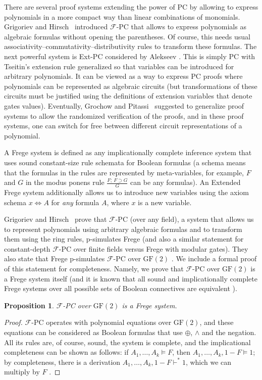 \documentclass[11pt]{article}
\newcommand{\scterm}[1]{{\textrm{\sc #1}}}
\newcommand{\F}{\scterm{Frege}}
\newcommand{\EF}{\scterm{Extended {\F}}}
\newcommand{\extpc}{\scterm{Ext-PC}}
\newcommand{\fpc}{\scterm{$\mathcal{F}$-PC}}
\newcommand{\pc}{\scterm{PC}}
\newcommand{\GF}{\mathrm{GF}}
\numberwithin{equation}{section}
\newtheorem{proposition}[theorem]{Proposition}
\begin{document}
There are several proof systems extending the power of {\pc} by
allowing to express polynomials in a more compact way than linear combinations of monomials.
Grigoriev and Hirsch~\cite{GH03} introduced {\fpc} that allows
to express polynomials as algebraic formulas without opening the parentheses.
Of course, this needs usual associativity--commutativity--distributivity rules
to transform these formulas. The next powerful system is
{\extpc} considered by Alekseev \cite{Ale21}. This is simply {\pc}
with Tseitin's extension rule generalized so that variables
can be introduced for arbitrary polynomials. It can be viewed as
a way to express {\pc} proofs where polynomials can be represented
as algebraic circuits (but transformations of these circuits 
must be justified using the definitions of extension variables 
that denote gates values).
Eventually, Grochow and Pitassi~\cite{Pit96,GP18} suggested to
generalize proof systems to allow the randomized verification of the proofs,
and in these proof systems, one can switch for free between different 
circuit representations of a polynomial.

A {\F} system \cite[\S2]{CR79} is defined as any implicationally complete inference system
that uses sound constant-size rule schemata for Boolean formulas (a schema
means that the formulas in the rules are represented by meta-variables,
for example, $F$ and $G$ in the modus ponens rule $\frac{F;\ F\supset G}{G}$
can be any formulas). An {\EF} system additionally allows us to introduce new
variables using the axiom schema $x \Leftrightarrow A$ for \emph{any} formula $A$, 
where $x$ is a new variable.

Grigoriev and Hirsch~\cite[Theorem 3]{GH03} prove that {\fpc} (over any field),
a system that allows us to represent polynomials using arbitrary algebraic formulas and to transform them using the ring rules,
p-simulates {\F} (and also a similar statement for constant-depth {\fpc} over finite fields versus {\F} with modular gates). They also state that {\F} p-simulates {\fpc} over $\GF(2)$ \cite[Remark 5]{GH03}. We include a formal proof of this statement for completeness.
Namely, we prove that {\fpc} over $\GF(2)$ is a {\F} system itself
(and it is known that all sound and implicationally complete {\F} systems over all possible sets of Boolean connectives are equivalent \cite[Theorem 5.3.1.4.i]{Rec76}).
\begin{proposition}\label{prop:f-sim-fpc}
{\fpc} over $\GF(2)$ is a {\F} system.
\end{proposition}
\begin{proof}
{\fpc} operates with polynomial equations over $\GF(2)$,
and these equations can be considered 
as Boolean formulas that use $\oplus$, $\land$ and the negation.
All its rules are, of course, sound, the system is complete, 
and the implicational completeness
can be shown as follows: if $A_1,\dotsc,A_k\models F$, then
$A_1,\dotsc,A_k,1-F\models 1$; by completeness,
there is a derivation $A_1,\dotsc,A_k,1-F\vdash^* 1$,
which we can multiply by $F$ \cite[Remark 2]{GH03}.
\end{proof}
\end{document}
